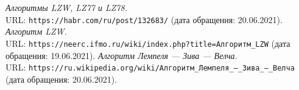 \begin{thebibliography}{99}
{\itshape Алгоритмы LZW, LZ77 и LZ78.} \\URL: \texttt{https://habr.com/ru/post/132683/} (дата обращения: 20.06.2021).
{\itshape Алгоритм LZW.} \\URL: \texttt{https://neerc.ifmo.ru/wiki/index.php?title=Алгоритм\_LZW} (дата обращения: 19.06.2021).
{\itshape Алгоритм Лемпеля — Зива — Велча.} \\URL: \texttt{https://ru.wikipedia.org/wiki/Алгоритм\_Лемпеля\_—\_Зива\_—\_Велча} (дата обращения: 20.06.2021).
\end{thebibliography}
\pagebreak


